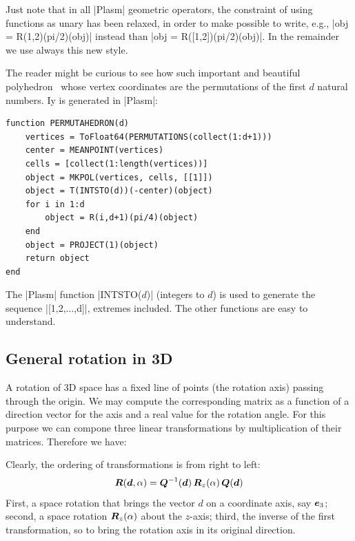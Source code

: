 \begin{remark}
Just note that in all |Plasm| geometric operators, the constraint of using functions as unary has been relaxed, in order to make possible to write, e.g., |obj = R(1,2)(pi/2)(obj)| instead than |obj = R([1,2])(pi/2)(obj)|. In the remainder we use always this new style.
\end{remark}


\begin{coding}[Permutahedron] The reader might be curious to see how such important and beautiful polyhedron~\cite{wiki:pao:100} whose vertex coordinates are the permutations of the first $d$ natural numbers. Iy is generated in |Plasm|:
\begin{lstlisting}[language=JuliaLocal, style=julia, mathescape=true]
function PERMUTAHEDRON(d)
	vertices = ToFloat64(PERMUTATIONS(collect(1:d+1)))
	center = MEANPOINT(vertices)
	cells = [collect(1:length(vertices))]
	object = MKPOL(vertices, cells, [[1]])
	object = T(INTSTO(d))(-center)(object)
	for i in 1:d
		object = R(i,d+1)(pi/4)(object)
	end
	object = PROJECT(1)(object)
	return object
end
\end{lstlisting}
The |Plasm| function |INTSTO($d$)| (integers to $d$) is used to generate the sequence |[1,2,$\ldots$,d]|, extremes included. The other functions are easy to understand.
\end{coding}




\subsection*{General rotation in 3D}

A rotation of 3D space has a fixed line of points (the rotation axis) passing through the origin. We may compute the corresponding matrix as a function of a direction vector for the axis and a real value for the rotation angle. For this purpose we can compone three linear transformations by multiplication of their matrices.  Therefore we have:

\begin{definition}
Clearly, the ordering of transformations is from right to left:
\[
{\mbox{\boldmath $R$}}({\mbox{\boldmath $d$}},\alpha) = {\mbox{\boldmath $Q$}}^{-1}({\mbox{\boldmath $d$}})\, {\mbox{\boldmath $R$}}_z(\alpha)\, {\mbox{\boldmath $Q$}}({\mbox{\boldmath $d$}})
\]
First, a space rotation that brings the vector $d$ on a coordinate axis, say ${\mbox{\boldmath $e$}}_3$; second, a space rotation ${\mbox{\boldmath $R$}}_z(\alpha)$ about the $z$-axis; third, the inverse of the first transformation, so to bring the rotation axis in its original direction.
\end{definition}


